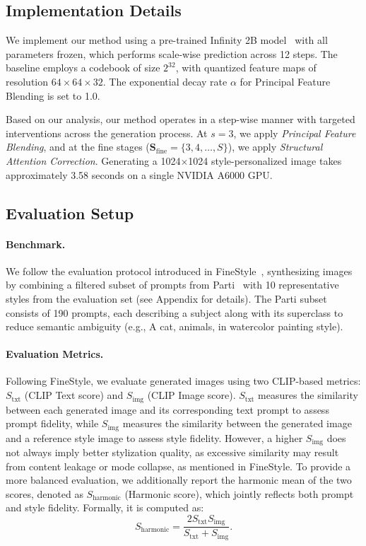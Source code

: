 \documentclass[10pt,twocolumn,letterpaper]{article}
\begin{document}
\subsection{Implementation Details}


We implement our method using a pre-trained Infinity 2B model~\cite{han2025infinity} with all parameters frozen, which performs scale-wise prediction across 12 steps. The baseline employs a codebook of size $2^{32}$, with quantized feature maps of resolution $64\times 64\times 32$. The exponential decay rate $\alpha$ for Principal Feature Blending is set to 1.0.

Based on our analysis, our method operates in a step-wise manner with targeted interventions across the generation process. At $s=3$, we apply \textit{Principal Feature Blending}, 
and at the fine stages ($\mathbf{S}_\text{fine} = \{3, 4, \dots, S\}$), we apply \textit{Structural Attention Correction}. Generating a 1024$\times$1024 style-personalized image takes approximately 3.58 seconds on a single NVIDIA A6000 GPU.




\subsection{Evaluation Setup}
\label{sec:evaluation}
\paragraph{Benchmark.}
We follow the evaluation protocol introduced in FineStyle~\cite{zhang2024finestyle}, synthesizing images by combining a filtered subset of prompts from Parti~\cite{yu2022scaling} with 10 representative styles from the evaluation set (see Appendix for details).
The Parti subset consists of 190 prompts, each describing a subject along with its superclass to reduce semantic ambiguity (e.g., A cat, animals, in watercolor painting style).


\paragraph{Evaluation Metrics.}
Following FineStyle, we evaluate generated images using two CLIP-based metrics: 
$S_{\text{txt}}$ (CLIP Text score) and $S_{\text{img}}$ (CLIP Image score).
$S_{\text{txt}}$ measures the similarity between each generated image and its corresponding text prompt to assess prompt fidelity, while $S_{\text{img}}$ measures the similarity between the generated image and a reference style image to assess style fidelity. 
However, a higher $S_{\text{img}}$ does not always imply better stylization quality, 
as excessive similarity may result from content leakage or mode collapse, as mentioned in FineStyle. To provide a more balanced evaluation, we additionally report the harmonic mean of the two scores, denoted as $S_{\text{harmonic}}$ (Harmonic score), which jointly reflects both prompt and style fidelity. Formally, it is computed as:
\begin{equation}
	S_{\text{harmonic}} = \frac{2  S_{\text{txt}} S_{\text{img}}}{S_{\text{txt}} + S_{\text{img}}}.    
\end{equation}
\end{document}
